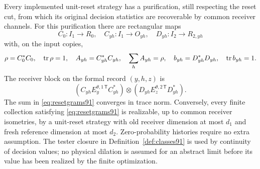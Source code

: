 \begin{lemma}\label{lem:resetnormal91}
Every implemented unit-reset strategy has a purification, still respecting the reset
cut, from which its original decision statistics are recoverable by
common receiver channels.  For this purification there are rectangular
maps
\[
 C_0:I_1\longrightarrow R_0,\quad
 C_{yh}:I_1\longrightarrow O_{yh},\quad
 D_{yh}:I_2\longrightarrow R_{2,yh}
\]
with, on the input copies,
\begin{equation}\label{eq:resetgrams91}
 \rho=C_0^*C_0,\quad \operatorname{tr}\rho=1,\quad
 A_{yh}=C_{yh}^*C_{yh},\quad \sum_hA_{yh}=\rho,\quad
 b_{yh}=D_{yh}^*D_{yh},\quad\operatorname{tr} b_{yh}=1.
\end{equation}
The receiver block on the formal record $(y,h,z)$ is
\begin{equation}\label{eq:resetblock91}
 (C_{yh}E_y^{\theta,1\,\mathsf T}C_{yh}^*)
 \otimes(D_{yh}E_z^{\theta,2\,\mathsf T}D_{yh}^*).
\end{equation}
The sum in \eqref{eq:resetgrams91} converges in trace norm.
Conversely, every finite collection satisfying \eqref{eq:resetgrams91}
is realizable, up to common receiver isometries, by a unit-reset strategy
with old receiver dimension at most $d_1$ and fresh reference dimension
at most $d_2$.  Zero-probability histories require no extra assumption.
The tester closure in Definition~\ref{def:classes91} is used by continuity
of decision values; no physical dilation is assumed for an abstract
limit before its value has been realized by the finite optimization.
\end{lemma}

